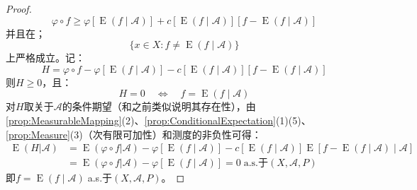 \begin{proof}
\begin{equation*}
		\varphi\circ f\geqslant\varphi[\operatorname{E}(f\mid\mathscr{A})]+c[\operatorname{E}(f\mid\mathscr{A})][f-\operatorname{E}(f\mid\mathscr{A})]
	\end{equation*}
	并且在；
	\begin{equation*}
		\{x\in X:f\ne\operatorname{E}(f\mid\mathscr{A})\}
	\end{equation*}
	上严格成立。记：
	\begin{equation*}
		H=\varphi\circ f-\varphi[\operatorname{E}(f\mid\mathscr{A})]-c[\operatorname{E}(f\mid\mathscr{A})][f-\operatorname{E}(f\mid\mathscr{A})]
	\end{equation*}
	则$H\geqslant 0$，且：
	\begin{equation*}
		H=0\quad\Longleftrightarrow\quad f=\operatorname{E}(f\mid\mathscr{A})
	\end{equation*}
	对$H$取关于$\mathscr{A}$的条件期望（和之前类似说明其存在性），由\cref{prop:MeasurableMapping}(2)、\cref{prop:ConditionalExpectation}(1)(5)、\cref{prop:Measure}(3)（次有限可加性）和测度的非负性可得：
	\begin{align*}
		\operatorname{E}(H|\mathscr{A})&=\operatorname{E}(\varphi\circ f|\mathscr{A})-\varphi[\operatorname{E}(f\mid\mathscr{A})]-c[\operatorname{E}(f\mid\mathscr{A})]\operatorname{E}[f-\operatorname{E}(f\mid\mathscr{A})\mid\mathscr{A}] \\
		&=\operatorname{E}(\varphi\circ f|\mathscr{A})-\varphi[\operatorname{E}(f\mid\mathscr{A})]=0\;\text{a.s.于}(X,\mathscr{A},P)
	\end{align*}
	即$f=\operatorname{E}(f\mid\mathscr{A})\;$a.s.于$(X,\mathscr{A},P)$。
\end{proof}
